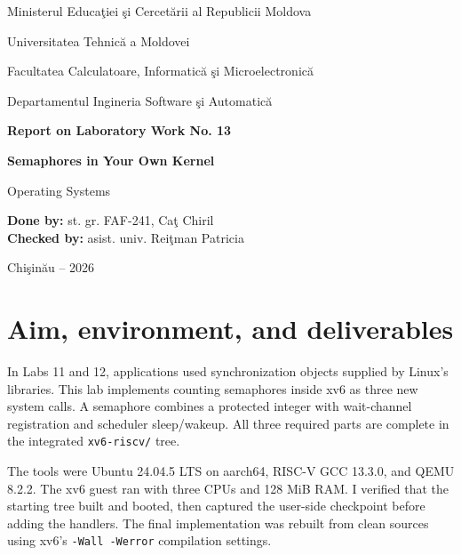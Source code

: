 \documentclass[12pt]{article}
\begin{document}
\begin{titlepage}
\centering
{\large Ministerul Educa\c{t}iei \c{s}i Cercet\u{a}rii al Republicii Moldova\par}
\vspace{0.45cm}
{\large Universitatea Tehnic\u{a} a Moldovei\par}
\vspace{0.45cm}
{\large Facultatea Calculatoare, Informatic\u{a} \c{s}i Microelectronic\u{a}\par}
\vspace{0.45cm}
{\large Departamentul Ingineria Software \c{s}i Automatic\u{a}\par}
\vspace{3cm}
{\Large\bfseries Report on Laboratory Work No. 13\par}
\vspace{0.55cm}
{\LARGE\bfseries Semaphores in Your Own Kernel\par}
\vspace{0.35cm}
{\large Operating Systems\par}
\vfill
\begin{flushleft}
\textbf{Done by:} st. gr. FAF-241, Ca\c{t} Chiril\\[0.8cm]
\textbf{Checked by:} asist. univ. Rei\c{t}man Patricia
\end{flushleft}
\vfill
{Chi\c{s}in\u{a}u -- 2026\par}
\end{titlepage}
\tableofcontents
\clearpage
{}

\section{Aim, environment, and deliverables}
In Labs 11 and 12, applications used synchronization objects supplied by
Linux's libraries. This lab implements counting semaphores inside xv6 as
three new system calls. A semaphore combines a protected integer with
wait-channel registration and scheduler sleep/wakeup. All three required
parts are complete in the integrated \texttt{xv6-riscv/} tree.

The tools were Ubuntu 24.04.5 LTS on aarch64, RISC-V GCC 13.3.0, and QEMU
8.2.2. The xv6 guest ran with three CPUs and 128 MiB RAM. I verified that
the starting tree built and booted, then captured the user-side checkpoint
before adding the handlers. The final implementation was rebuilt from clean
sources using xv6's \texttt{-Wall -Werror} compilation settings.
\end{document}

